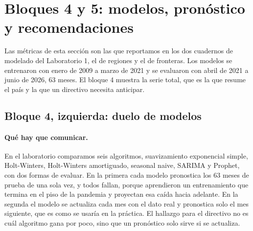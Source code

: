 \section{Bloques 4 y 5: modelos, pronóstico y recomendaciones}

Las métricas de esta sección son las que reportamos en los dos cuadernos de modelado del
Laboratorio 1, el de regiones y el de fronteras. Los modelos se
entrenaron con enero de 2009 a marzo de 2021 y se evaluaron con abril de 2021 a junio de 2026,
63 meses. El bloque 4 muestra la serie total, que es la que resume el país y la que un directivo
necesita anticipar.

\subsection{Bloque 4, izquierda: duelo de modelos}

\paragraph{Qué hay que comunicar.} En el laboratorio comparamos seis algoritmos, suavizamiento
exponencial simple, Holt-Winters, Holt-Winters amortiguado, seasonal naive, SARIMA y Prophet, con
dos formas de evaluar. En la primera cada modelo pronostica los 63 meses de prueba de una sola
vez, y todos fallan, porque aprendieron un entrenamiento que termina en el piso de la pandemia y
proyectan esa caída hacia adelante. En la segunda el modelo se actualiza cada mes con el dato
real y pronostica solo el mes siguiente, que es como se usaría en la práctica. El hallazgo para
el directivo no es cuál algoritmo gana por poco, sino que un pronóstico solo sirve si se
actualiza.

